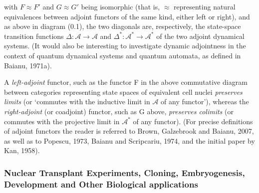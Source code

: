 \documentclass[12pt]{article}
\theoremstyle{plain}
\theoremstyle{definition}
\theoremstyle{plain}
\numberwithin{equation}{section}
\newcommand{\A}{\mathcal A}
\begin{document}
with $F \approx F'$  and $G \approx G'$ being isomorphic (that is,  $\approx$ representing natural equivalences between adjoint functors of the same kind, either left or right), and as above in diagram (0.1), the two diagonals are, respectively, the state-space transition functions $\Delta: \A  \rightarrow  \A$   and $\Delta^*: \A^* \rightarrow   \A^*$  of the two adjoint dynamical systems. (It would also be interesting to investigate dynamic adjointness in the context of quantum dynamical systems and quantum automata, as defined in Baianu, 1971a).


 A \emph{left-adjoint} functor, such as the functor F in the above commutative diagram between categories representing state spaces of equivalent cell nuclei \emph{preserves limits} (or `commutes with the inductive limit in $\A$ of any functor'), whereas the \emph{right-adjoint} (or coadjoint) functor, such as G above, \emph{preserves colimits} (or commutes with the projective limit in $\A^*$ of any functor). (For precise definitions of adjoint functors the reader is
referred to Brown, Galzebrook and Baianu, 2007, as well as to Popescu, 1973,
Baianu and Scripcariu, 1974, and the initial paper by Kan, 1958). 

\subsubsection{Nuclear Transplant Experiments, Cloning, Embryogenesis, Development and Other Biological applications}
\end{document}
